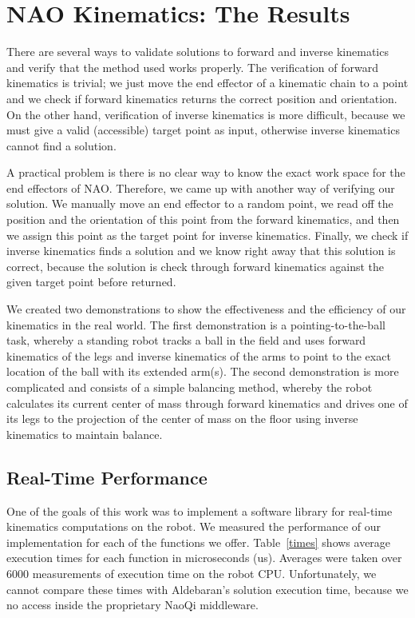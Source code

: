 \chapter{NAO Kinematics: The Results}
\label{Results}

There are several ways to validate solutions to forward and inverse kinematics and verify that the method used works properly. The verification of forward kinematics is trivial; we just move the end effector of a kinematic chain to a point and we check if forward kinematics returns the correct position and orientation. On the other hand, verification of inverse kinematics is more difficult, because we must give a valid (accessible) target point as input, otherwise inverse kinematics cannot find a solution.

A practical problem is there is no clear way to know the exact work space for the end effectors of NAO. Therefore, we came up with another way of verifying our solution. We manually move an end effector to a random point, we read off the position and the orientation of this point from the forward kinematics, and then we assign this point as the target point for inverse kinematics. Finally, we check if inverse kinematics finds a solution and we know right away that this solution is correct, because the solution is check through forward kinematics against the given target point before returned.

We created two demonstrations to show the effectiveness and the efficiency of our kinematics in the real world. The first demonstration is a pointing-to-the-ball task, whereby a standing robot tracks a ball in the field and uses forward kinematics of the legs and inverse kinematics of the arms to point to the exact location of the ball with its extended arm(s). The second demonstration is more complicated and consists of a simple balancing method, whereby the robot calculates its current center of mass through forward kinematics and drives one of its legs to the projection of the center of mass on the floor using inverse kinematics to maintain balance.


\section{Real-Time Performance}
One of the goals of this work was to implement a software library for real-time kinematics computations on the robot. We measured the performance of our implementation for each of the functions we offer. Table~\ref{times} shows average execution times for each function in microseconds (us). Averages were taken over 6000 measurements of execution time on the robot CPU. Unfortunately, we cannot compare these times with Aldebaran's solution execution time, because we no access inside the proprietary NaoQi middleware. 

